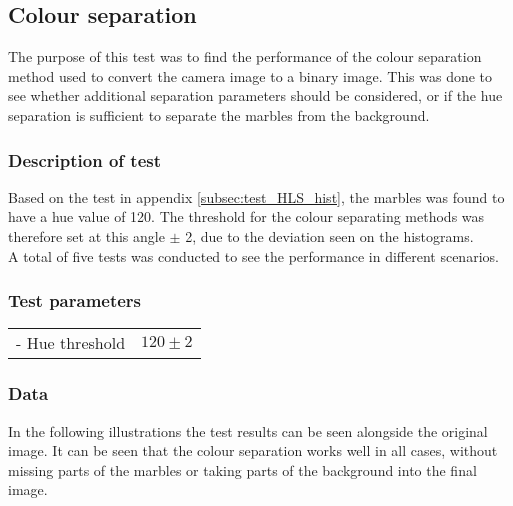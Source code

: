\documentclass[../Head/Main.tex]{subfiles}
\begin{document}
\subsection{Colour separation}
\label{subsec:test_colour_separation}
The purpose of this test was to find the performance of the colour separation method used to convert the camera image to a binary image. This was done to see whether additional separation parameters should be considered, or if the hue separation is sufficient to separate the marbles from the background.
\subsubsection*{Description of test}
Based on the test in appendix \ref{subsec:test_HLS_hist}, the marbles was found to have a hue value of 120. The threshold for the colour separating methods was therefore set at this angle $\pm$ 2, due to the deviation seen on the histograms.\\
A total of five tests was conducted to see the performance in different scenarios. 

\subsubsection*{Test parameters}
\begin{minipage}[c]{0.35\textwidth}
	\begin{tabular}{l r}
	- Hue threshold                   & $120\pm 2$\\
	\end{tabular}
\end{minipage}	

\subsubsection*{Data}
In the following illustrations the test results can be seen alongside the original image. It can be seen that the colour separation works well in all cases, without missing parts of the marbles or taking parts of the background into the final image.
\end{document}
